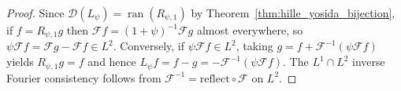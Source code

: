 \begin{proof}
\leanok
Since $\mathcal{D}(L_\psi) = \operatorname{ran}(R_{\psi, 1})$ by Theorem~\ref{thm:hille_yosida_bijection}, if $f = R_{\psi, 1} g$ then $\mathcal{F}f = (1 + \psi)^{-1} \mathcal{F}g$ almost everywhere, so $\psi \mathcal{F}f = \mathcal{F}g - \mathcal{F}f \in L^2$. Conversely, if $\psi \mathcal{F}f \in L^2$, taking $g = f + \mathcal{F}^{-1}(\psi \mathcal{F}f)$ yields $R_{\psi, 1} g = f$ and hence $L_\psi f = f - g = -\mathcal{F}^{-1}(\psi \mathcal{F}f)$. The $L^1 \cap L^2$ inverse Fourier consistency follows from $\mathcal{F}^{-1} = \mathrm{reflect} \circ \mathcal{F}$ on $L^2$.
\end{proof}
